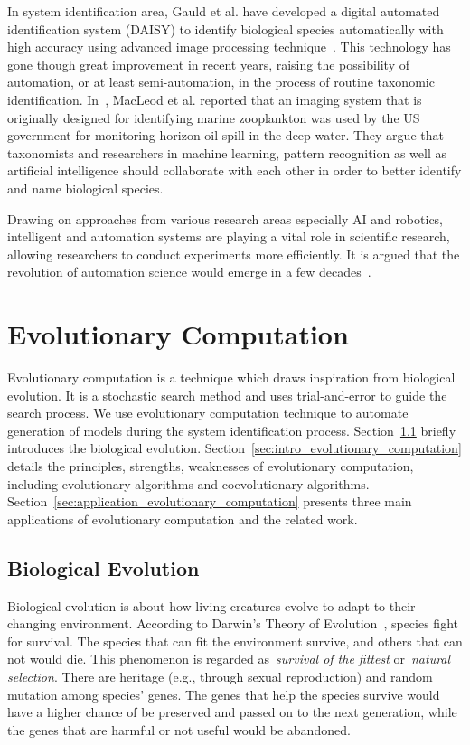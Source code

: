 In system identification area, Gauld et al. have developed a digital automated identification system (DAISY) to identify biological species automatically with high accuracy using advanced image processing technique~\cite{Gauld_2000}. This technology has gone though great improvement in recent years, raising the possibility of automation, or at least semi-automation, in the process of routine taxonomic identification. In~\cite{MacLeod_2010}, MacLeod et al. reported that an imaging system that is originally designed for identifying marine zooplankton was used by the US government for monitoring horizon oil spill in the deep water. They argue that taxonomists and researchers in machine learning, pattern recognition as well as artificial intelligence should collaborate with each other in order to better identify and name biological species. 

Drawing on approaches from various research areas especially AI and robotics, intelligent and automation systems are playing a vital role in scientific research, allowing researchers to conduct experiments more efficiently. It is argued that the revolution of automation science would emerge in a few decades~\cite{King_2009}.

\section{Evolutionary Computation}\label{sec:evolutionary_computation}

Evolutionary computation is a technique which draws inspiration from biological evolution. It is a stochastic search method and uses trial-and-error to guide the search process. We use evolutionary computation technique to automate  generation of models during the system identification process. Section~\ref{sec:natural_evolution} briefly introduces the biological evolution. Section~\ref{sec:intro_evolutionary_computation} details the principles, strengths, weaknesses of evolutionary computation, including evolutionary algorithms and coevolutionary algorithms. Section~\ref{sec:application_evolutionary_computation} presents three main applications of evolutionary computation and the related work.

\subsection{Biological Evolution}\label{sec:natural_evolution}

Biological evolution is about how living creatures evolve to adapt to their changing environment. According to Darwin's Theory of Evolution~\cite{Darwin_1859}, species fight for survival. The species that can fit the environment survive, and others that can not would die. This phenomenon is regarded as~\textit{survival of the fittest} or~\textit{natural selection}. There are heritage (e.g., through sexual reproduction) and random mutation among species' genes. The genes that help the species survive would have a higher chance of be preserved and passed on to the next generation, while the genes that are harmful or not useful would be abandoned. 

